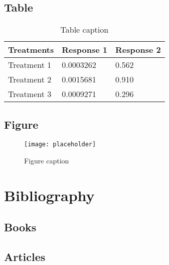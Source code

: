 \documentclass[11pt,fleqn]{book} %
\begin{document}
\section{Table}

\begin{table}[h]
\centering
\begin{tabular}{l l l}
\toprule
\textbf{Treatments} & \textbf{Response 1} & \textbf{Response 2}\\
\midrule
Treatment 1 & 0.0003262 & 0.562 \\
Treatment 2 & 0.0015681 & 0.910 \\
Treatment 3 & 0.0009271 & 0.296 \\
\bottomrule
\end{tabular}
\caption{Table caption}
\end{table}


\section{Figure}

\begin{figure}[h]
\centering\texttt{[image: placeholder]}
\caption{Figure caption}
\end{figure}


\chapter*{Bibliography}
\section*{Books}
\printbibliography[heading=bibempty,type=book]
\section*{Articles}
\printbibliography[heading=bibempty,type=article]


\cleardoublepage
{}
\setlength{\columnsep}{0.75cm}
\printindex

\end{document}
